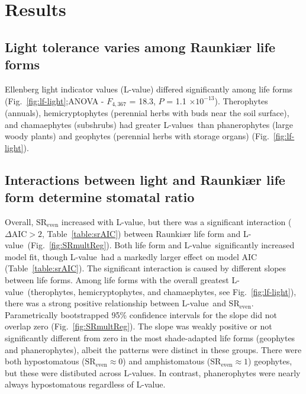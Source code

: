 \documentclass[12pt, oneside]{article}
\newcommand{\el}{L-value}
\newcommand{\els}{L-values}
\begin{document}

\section*{Results}

\subsection*{Light tolerance varies among Raunki\ae r life forms}

Ellenberg light indicator values (\el) differed significantly among life forms (Fig.~\ref{fig:lf-light};ANOVA - $F_{4, 367}$ = 18.3, $P$ = 1.1 $\times10^{-13}$). Therophytes (annuals), hemicryptophytes (perennial herbs with buds near the soil surface), and chamaephytes (subshrubs) had greater \els~than phanerophytes (large woody plants) and geophytes (perennial herbs with storage organs) (Fig.~\ref{fig:lf-light}).

\subsection*{Interactions between light and Raunki\ae r life form determine stomatal ratio}

Overall, $\mathrm{SR_{even}}$ increased with \el, but there was a significant interaction ($\Delta\mathrm{AIC} > 2$, Table~\ref{table:srAIC}) between Raunki\ae r life form and \el~(Fig.~\ref{fig:SRmultReg}). Both life form and \el~significantly increased model fit, though \el~had a markedly larger effect on model AIC (Table~\ref{table:srAIC}). The significant interaction is caused by different slopes between life forms. Among life forms with the overall greatest \el~(therophytes, hemicryptophytes, and chamaephytes, see Fig.~\ref{fig:lf-light}), there was a strong positive relationship between \el~and $\mathrm{SR_{even}}$. Parametrically bootstrapped 95\% confidence intervals for the slope did not overlap zero (Fig.~\ref{fig:SRmultReg}). The slope was weakly positive or not significantly different from zero in the most shade-adapted life forms (geophytes and phanerophytes), albeit the patterns were distinct in these groups. There were both hypostomatous ($\mathrm{SR_{even}} \approx 0$) and amphistomatous ($\mathrm{SR_{even}} \approx 1$) geophytes, but these were distibuted across \el s. In contrast, phanerophytes were nearly always hypostomatous regardless of \el. %
\end{document}

